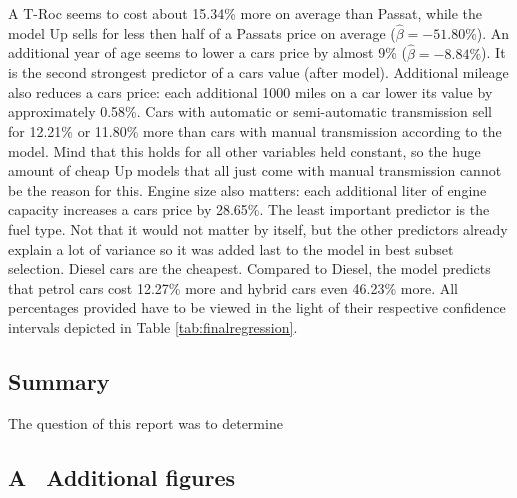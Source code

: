 \documentclass[12 pt]{scrartcl}
\begin{document}
A T-Roc seems to cost about 15.34\% more on average than Passat, while the model Up sells for less then half of a Passats price on average ($\hat{\beta} = -51.80\%$). An additional year of age seems to lower a cars price by almost 9\% ($\hat{\beta} = -8.84\%$). It is the second strongest predictor of a cars value (after model). Additional mileage also reduces a cars price: each additional 1000 miles on a car lower its value by approximately 0.58\%. Cars with
automatic or semi-automatic transmission sell for 12.21\% or 11.80\% more than cars with manual transmission according to the model. Mind that this holds for all other variables held constant, so the huge amount of cheap Up models that all just come with manual transmission cannot be the reason for this.
Engine size also matters: each additional liter of engine capacity increases a cars price by 28.65\%. The least important predictor is the fuel type. Not that it would not matter by itself, but the other predictors already explain a lot of variance so it was added last to the model in best subset selection.
Diesel cars are the cheapest. Compared to Diesel, the model predicts that petrol cars cost 12.27\% more and hybrid cars even 46.23\% more.
All percentages provided have to be viewed in the light of their respective confidence intervals depicted in Table \ref{tab:finalregression}.

\subsection{Summary}

The question of this report was to determine

\newpage
{}
\renewcommand\refname{Bibliography}


\newpage
\appendix
{}
\subsection*{A \ Additional figures}
\end{document}
